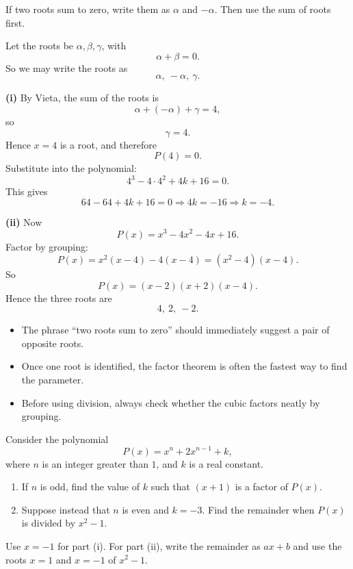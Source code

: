 \begin{hintbox}
If two roots sum to zero, write them as $\alpha$ and $-\alpha$. Then use the sum of roots first.
\end{hintbox}

\begin{solution}
Let the roots be $\alpha,\beta,\gamma$, with
\[
\alpha+\beta=0.
\]
So we may write the roots as
\[
\alpha,\ -\alpha,\ \gamma.
\]

\textbf{(i)} By Vieta, the sum of the roots is
\[
\alpha+(-\alpha)+\gamma=4,
\]
so
\[
\gamma=4.
\]
Hence $x=4$ is a root, and therefore
\[
P(4)=0.
\]
Substitute into the polynomial:
\[
4^3-4\cdot 4^2+4k+16=0.
\]
This gives
\[
64-64+4k+16=0 \Rightarrow 4k=-16 \Rightarrow \boxed{k=-4.}
\]

\textbf{(ii)} Now
\[
P(x)=x^3-4x^2-4x+16.
\]
Factor by grouping:
\[
P(x)=x^2(x-4)-4(x-4)=(x^2-4)(x-4).
\]
So
\[
P(x)=(x-2)(x+2)(x-4).
\]
Hence the three roots are
\[
\boxed{4,\ 2,\ -2.}
\]
\end{solution}

\begin{takeaways}
\begin{itemize}[leftmargin=*]
\item The phrase ``two roots sum to zero'' should immediately suggest a pair of opposite roots.
\item Once one root is identified, the factor theorem is often the fastest way to find the parameter.
\item Before using division, always check whether the cubic factors neatly by grouping.
\end{itemize}
\end{takeaways}

\begin{problem}
Consider the polynomial
\[
P(x)=x^n+2x^{n-1}+k,
\]
where $n$ is an integer greater than $1$, and $k$ is a real constant.
\begin{enumerate}[label=(\roman*)]
\item If $n$ is odd, find the value of $k$ such that $(x+1)$ is a factor of $P(x)$.
\item Suppose instead that $n$ is even and $k=-3$. Find the remainder when $P(x)$ is divided by $x^2-1$.
\end{enumerate}
\end{problem}

\begin{hintbox}
Use $x=-1$ for part (i). For part (ii), write the remainder as $ax+b$ and use the roots $x=1$ and $x=-1$ of $x^2-1$.
\end{hintbox}

